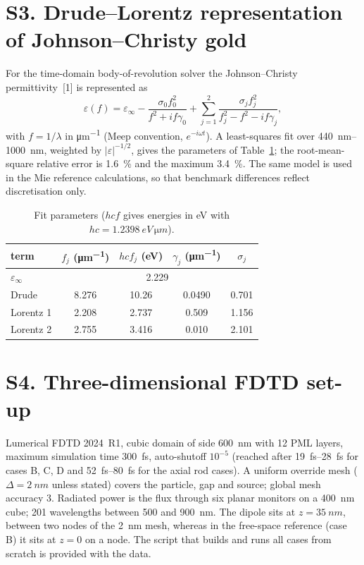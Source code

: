 \documentclass[11pt,a4paper]{article}
\begin{document}
\section*{S3. Drude--Lorentz representation of Johnson--Christy gold}
For the time-domain body-of-revolution solver the Johnson--Christy permittivity~[1] is represented as
\begin{equation}
\varepsilon(f)=\varepsilon_\infty-\frac{\sigma_0 f_0^2}{f^2+i f\gamma_0}
+\sum_{j=1}^{2}\frac{\sigma_j f_j^2}{f_j^2-f^2-i f\gamma_j},
\end{equation}
with $f=1/\lambda$ in \si{\micro\metre^{-1}} (Meep convention, $e^{-i\omega t}$). A least-squares fit over
\SIrange{440}{1000}{nm}, weighted by $|\varepsilon|^{-1/2}$, gives the parameters of Table~\ref{tab:fit}; the
root-mean-square relative error is \SI{1.6}{\percent} and the maximum \SI{3.4}{\percent}. The same model is used in
the Mie reference calculations, so that benchmark differences reflect discretisation only.

\begin{table}[h]\centering\caption{Fit parameters ($hc f$ gives energies in eV with $hc=\SI{1.2398}{eV\,\micro m}$).}\label{tab:fit}
\begin{tabular}{lcccc}\toprule
term & $f_j$ (\si{\micro\metre^{-1}}) & $hc f_j$ (eV) & $\gamma_j$ (\si{\micro\metre^{-1}}) & $\sigma_j$\\\midrule
$\varepsilon_\infty$ & \multicolumn{4}{c}{2.229}\\
Drude & 8.276 & 10.26 & 0.0490 & 0.701\\
Lorentz 1 & 2.208 & 2.737 & 0.509 & 1.156\\
Lorentz 2 & 2.755 & 3.416 & 0.010 & 2.101\\\bottomrule
\end{tabular}\end{table}

\section*{S4. Three-dimensional FDTD set-up}
Lumerical FDTD 2024~R1, cubic domain of side \SI{600}{nm} with 12 PML layers, maximum simulation time
\SI{300}{fs}, auto-shutoff $10^{-5}$ (reached after \SIrange{19}{28}{fs} for cases B, C, D and
\SIrange{52}{80}{fs} for the axial rod cases). A uniform override mesh ($\Delta=\SI{2}{nm}$ unless stated) covers
the particle, gap and source; global mesh accuracy 3. Radiated power is the flux through six planar monitors on a
\SI{400}{nm} cube; 201 wavelengths between 500 and \SI{900}{nm}. The dipole sits at $z=\SI{35}{nm}$, between two
nodes of the \SI{2}{nm} mesh, whereas in the free-space reference (case B) it sits at $z=0$ on a node. The
script that builds and runs all cases from scratch is provided with the data.
\end{document}
